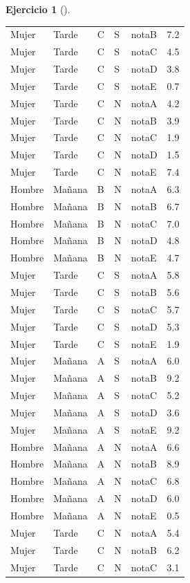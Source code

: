 \documentclass[
  a4paper,
]{scrreport}
\theoremstyle{definition}
\newtheorem{exercise}{Ejercicio}[chapter]
\theoremstyle{remark}
\begin{document}
\begin{exercise}[]
\begin{enumerate}
\begin{tcolorbox}
\begin{longtable}[]{@{}lllllr@{}}
  Mujer & Tarde & C & S & notaB & 7.2 \\
  Mujer & Tarde & C & S & notaC & 4.5 \\
  Mujer & Tarde & C & S & notaD & 3.8 \\
  Mujer & Tarde & C & S & notaE & 0.7 \\
  Mujer & Tarde & C & N & notaA & 4.2 \\
  Mujer & Tarde & C & N & notaB & 3.9 \\
  Mujer & Tarde & C & N & notaC & 1.9 \\
  Mujer & Tarde & C & N & notaD & 1.5 \\
  Mujer & Tarde & C & N & notaE & 7.4 \\
  Hombre & Mañana & B & N & notaA & 6.3 \\
  Hombre & Mañana & B & N & notaB & 6.7 \\
  Hombre & Mañana & B & N & notaC & 7.0 \\
  Hombre & Mañana & B & N & notaD & 4.8 \\
  Hombre & Mañana & B & N & notaE & 4.7 \\
  Mujer & Tarde & C & S & notaA & 5.8 \\
  Mujer & Tarde & C & S & notaB & 5.6 \\
  Mujer & Tarde & C & S & notaC & 5.7 \\
  Mujer & Tarde & C & S & notaD & 5.3 \\
  Mujer & Tarde & C & S & notaE & 1.9 \\
  Mujer & Mañana & A & S & notaA & 6.0 \\
  Mujer & Mañana & A & S & notaB & 9.2 \\
  Mujer & Mañana & A & S & notaC & 5.2 \\
  Mujer & Mañana & A & S & notaD & 3.6 \\
  Mujer & Mañana & A & S & notaE & 9.2 \\
  Hombre & Mañana & A & N & notaA & 6.6 \\
  Hombre & Mañana & A & N & notaB & 8.9 \\
  Hombre & Mañana & A & N & notaC & 6.8 \\
  Hombre & Mañana & A & N & notaD & 6.0 \\
  Hombre & Mañana & A & N & notaE & 0.5 \\
  Mujer & Tarde & C & N & notaA & 5.4 \\
  Mujer & Tarde & C & N & notaB & 6.2 \\
  Mujer & Tarde & C & N & notaC & 3.1 \\

\end{longtable}
\end{tcolorbox}
\end{enumerate}
\end{exercise}
\end{document}
